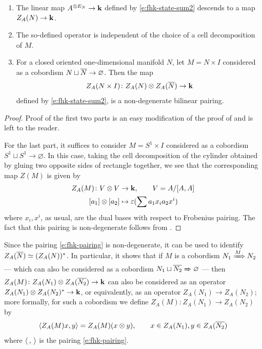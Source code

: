 \begin{theorem}\label{t:fhk2}
  \par\noindent
  \begin{enumerate}
    \item The linear map $A^{\otimes E_N}\to \mathbf{k}$
      defined by \eqref{e:fhk-state-sum2} descends to a
      map $Z_A(N)\to \mathbf{k}$.
    \item The so-defined operator is independent of the choice of a cell
      decomposition of $M$.
    \item For a closed oriented one-dimensional manifold $N$, let
      $M=N\times I$ considered as a cobordism $N\sqcup \overline{N}\to
       \varnothing$. Then the map
    \begin{equation}\label{e:fhk-pairing}
      Z_A(N\times I)\colon Z_A(N)\otimes Z_A(\overline{N})\to \mathbf{k}
    \end{equation}
    defined by \eqref{e:fhk-state-sum2}, is a non-degenerate bilinear pairing.
  \end{enumerate}
\end{theorem}
\begin{proof}
  Proof of the first two parts is an easy
  modification of the proof of  and is left to the reader.

  For the last part, it suffices to consider $M=S^1\times I$ considered as a
  cobordism $S^1\sqcup S^1\to \varnothing$. In this case, taking the cell
  decomposition of the cylinder obtained by gluing two opposite sides of
  rectangle together, we see that the corresponding map $Z(M)$ is given by
  \begin{align*}
    Z_A(M)\colon V\otimes V &\to \mathbf{k}, \qquad V=A/[A,A]\\
    [a_1]\otimes [a_2]&\mapsto \varepsilon(\sum a_1 x_i a_2x^i)
  \end{align*}
  where $x_i, x^i$, as usual, are the dual bases with respect to Frobenius
  pairing. The fact that this pairing is non-degenerate follows from
  .
\end{proof}


Since the pairing \eqref{e:fhk-pairing} is non-degenerate, it can be used to
identify $Z_A(\overline{N})\simeq (Z_A(N))^*$. In particular, it shows that if $M$ is
a cobordism $N_1\xRightarrow{M}N_2$ --- which can also be considered as a cobordism
$N_1\sqcup \overline{N_2}\xRightarrow{} \varnothing$ --- then $Z_A(M)\colon Z_A(N_1)\otimes
Z_A(\overline{N_2}) \to \mathbf{k}$ can also be considered as an operator $Z_A(N_1)\otimes
Z_A(N_2)^*\to\mathbf{k}$, or equivalently, as an operator $Z_A(N_1)\to Z_A(N_2)$; more
formally, for such a cobordism we define $Z_A(M)\colon Z_A(N_1)\to
Z_A(N_2)$ by
\begin{equation}\label{e:fhk-state-sum3}
  \langle Z_A(M)x, y\rangle= Z_A(M)(x\otimes y), \qquad x \in Z_A(N_1), y \in Z_A(\overline{N_2})
\end{equation}
where $\langle\, , \,\rangle$ is the pairing \eqref{e:fhk-pairing}.


